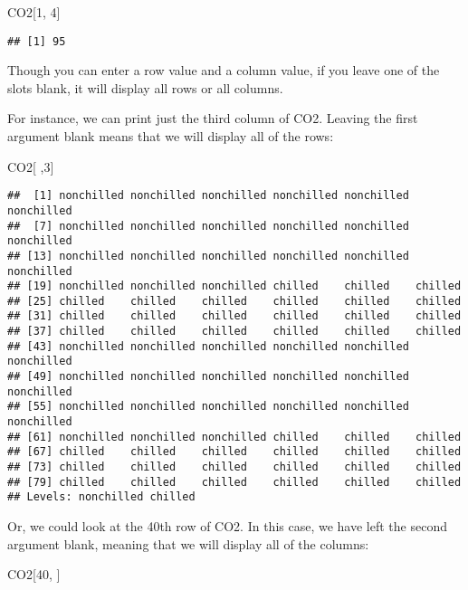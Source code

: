 \documentclass[]{article}
\newenvironment{Shaded}{\begin{snugshade}}{\end{snugshade}}
\newcommand{\DecValTok}[1]{\textcolor[rgb]{0.00,0.00,0.81}{#1}}
\newcommand{\NormalTok}[1]{#1}
\begin{document}
\begin{Shaded}
\begin{Highlighting}[]
\NormalTok{CO2[}\DecValTok{1}\NormalTok{, }\DecValTok{4}\NormalTok{]}
\end{Highlighting}
\end{Shaded}

\begin{verbatim}
## [1] 95
\end{verbatim}

Though you can enter a row value and a column value, if you leave one of
the slots blank, it will display all rows or all columns.

For instance, we can print just the third column of CO2. Leaving the
first argument blank means that we will display all of the rows:

\begin{Shaded}
\begin{Highlighting}[]
\NormalTok{CO2[ ,}\DecValTok{3}\NormalTok{]}
\end{Highlighting}
\end{Shaded}

\begin{verbatim}
##  [1] nonchilled nonchilled nonchilled nonchilled nonchilled nonchilled
##  [7] nonchilled nonchilled nonchilled nonchilled nonchilled nonchilled
## [13] nonchilled nonchilled nonchilled nonchilled nonchilled nonchilled
## [19] nonchilled nonchilled nonchilled chilled    chilled    chilled   
## [25] chilled    chilled    chilled    chilled    chilled    chilled   
## [31] chilled    chilled    chilled    chilled    chilled    chilled   
## [37] chilled    chilled    chilled    chilled    chilled    chilled   
## [43] nonchilled nonchilled nonchilled nonchilled nonchilled nonchilled
## [49] nonchilled nonchilled nonchilled nonchilled nonchilled nonchilled
## [55] nonchilled nonchilled nonchilled nonchilled nonchilled nonchilled
## [61] nonchilled nonchilled nonchilled chilled    chilled    chilled   
## [67] chilled    chilled    chilled    chilled    chilled    chilled   
## [73] chilled    chilled    chilled    chilled    chilled    chilled   
## [79] chilled    chilled    chilled    chilled    chilled    chilled   
## Levels: nonchilled chilled
\end{verbatim}

Or, we could look at the 40th row of CO2. In this case, we have left the
second argument blank, meaning that we will display all of the columns:

\begin{Shaded}
\begin{Highlighting}[]
\NormalTok{CO2[}\DecValTok{40}\NormalTok{, ]}
\end{Highlighting}
\end{Shaded}
\end{document}

